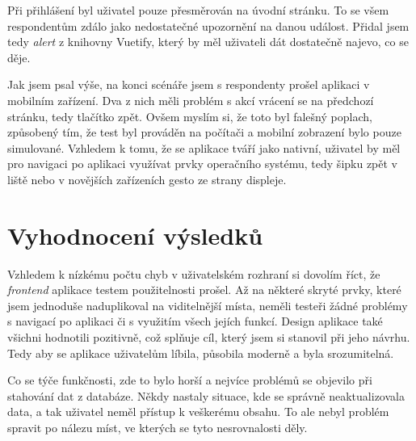 Při přihlášení byl uživatel pouze přesměrován na úvodní stránku. To se všem respondentům zdálo jako nedostatečné upozornění na danou událost.
Přidal jsem tedy \emph{alert} z knihovny Vuetify, který by měl uživateli dát dostatečně najevo, co se děje.

Jak jsem psal výše, na konci scénáře jsem s respondenty prošel aplikaci v mobilním zařízení. Dva z nich měli problém s akcí vrácení se na předchozí stránku,
tedy tlačítko zpět. Ovšem myslím si, že toto byl falešný poplach, způsobený tím, že test byl prováděn na počítači a mobilní zobrazení bylo pouze simulované.
Vzhledem k tomu, že se aplikace tváří jako nativní, uživatel by měl pro navigaci po aplikaci využívat prvky operačního systému, tedy šipku zpět v liště nebo
v novějších zařízeních gesto ze strany displeje.

\section{Vyhodnocení výsledků}

Vzhledem k nízkému počtu chyb v uživatelském rozhraní si dovolím říct, že \emph{frontend} aplikace testem použitelnosti prošel. Až na některé
skryté prvky, které jsem jednoduše naduplikoval na viditelnější místa, neměli testeři žádné problémy s navigací po aplikaci či s využitím
všech jejích funkcí. Design aplikace také všichni hodnotili pozitivně, což splňuje cíl, který jsem si stanovil při jeho návrhu. Tedy aby
se aplikace uživatelům líbila, působila moderně a byla srozumitelná.

Co se týče funkčnosti, zde to bylo horší a nejvíce problémů se objevilo při stahování dat z databáze. Někdy nastaly situace, kde se správně
neaktualizovala data, a tak uživatel neměl přístup k veškerému obsahu. To ale nebyl problém spravit po nálezu míst, ve kterých se tyto nesrovnalosti
děly.
